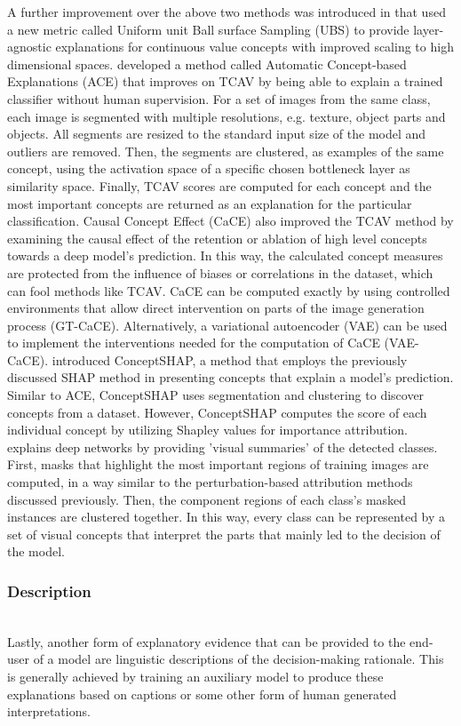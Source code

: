 \documentclass[journal]{IEEEtran}
\begin{document}
A further improvement over the above two methods was introduced in \cite{Yeche2019} that used a new metric called Uniform unit Ball surface Sampling (UBS) to provide layer-agnostic explanations for continuous value concepts with improved scaling to high dimensional spaces. 
\cite{Ghorbani2019} developed a method called Automatic Concept-based Explanations (ACE) that improves on TCAV by being able to explain a trained classifier without human supervision. For a set of images from the same class, each image is segmented with multiple resolutions, e.g. texture, object parts and objects. All segments are resized to the standard input size of the model and outliers are removed. Then, the segments are clustered, as examples of the same concept, using the activation space of a specific chosen bottleneck layer as similarity space. Finally, TCAV scores are computed for each concept and the most important concepts are returned as an explanation for the particular classification. 
Causal Concept Effect (CaCE) \cite{Goyal2019} also improved the TCAV method by examining the causal effect of the retention or ablation of high level concepts towards a deep model’s prediction. In this way, the calculated concept measures are protected from the influence of biases or correlations in the dataset, which can fool methods like TCAV. CaCE can be computed exactly by using controlled environments that allow direct intervention on parts of the image generation process (GT-CaCE). Alternatively, a variational autoencoder (VAE) can be used to implement the interventions needed for the computation of CaCE (VAE-CaCE). 
\cite{Yeh2019} introduced ConceptSHAP, a method that employs the previously discussed SHAP method in presenting concepts that explain a model's prediction. Similar to ACE, ConceptSHAP uses segmentation and clustering to discover concepts from a dataset. However, ConceptSHAP computes the score of each individual concept by utilizing Shapley values for importance attribution. 
\cite{Godi2019} explains deep networks by providing 'visual summaries' of the detected classes. First, masks that highlight the most important regions of training images are computed, in a way similar to the perturbation-based attribution methods discussed previously. Then, the component regions of each class's masked instances are clustered together. In this way, every class can be represented by a set of visual concepts that interpret the parts that mainly led to the decision of the model.

\subsubsection{Description}
\hfill\\
Lastly, another form of explanatory evidence that can be provided to the end-user of a model are linguistic descriptions of the decision-making rationale. This is generally achieved by training an auxiliary model to produce these explanations based on captions or some other form of human generated interpretations.  
\end{document}
